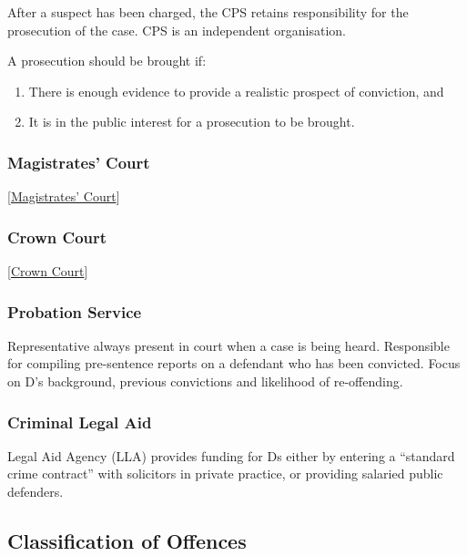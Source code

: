 \documentclass[
]{article}
\providecommand{\tightlist}{%
  \setlength{\itemsep}{0pt}\setlength{\parskip}{0pt}}
\begin{document}
After a suspect has been charged, the CPS retains responsibility for the
prosecution of the case. CPS is an independent organisation.

A prosecution should be brought if:

\begin{enumerate}
\def\labelenumi{\arabic{enumi}.}
\tightlist
\item
  There is enough evidence to provide a realistic prospect of
  conviction, and
\item
  It is in the public interest for a prosecution to be brought.
\end{enumerate}

\hypertarget{magistrates-court}{%
\subsubsection{Magistrates' Court}\label{magistrates-court}}

{[}\protect\hyperlink{magistrates-court}{Magistrates' Court}{]}

\hypertarget{crown-court}{%
\subsubsection{Crown Court}\label{crown-court}}

{[}\protect\hyperlink{crown-court}{Crown Court}{]}

\hypertarget{probation-service}{%
\subsubsection{Probation Service}\label{probation-service}}

Representative always present in court when a case is being heard.
Responsible for compiling pre-sentence reports on a defendant who has
been convicted. Focus on D's background, previous convictions and
likelihood of re-offending.

\hypertarget{criminal-legal-aid}{%
\subsubsection{Criminal Legal Aid}\label{criminal-legal-aid}}

Legal Aid Agency (LLA) provides funding for Ds either by entering a
``standard crime contract'' with solicitors in private practice, or
providing salaried public defenders.

\hypertarget{classification-of-offences}{%
\subsection{Classification of
Offences}\label{classification-of-offences}}
\end{document}
